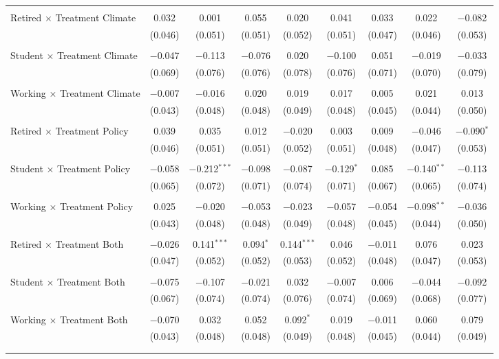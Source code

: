 \begin{tabular}{@{\extracolsep{5pt}}lcccccccc}
  & & & & & & & & \\ 
 Retired $\times$ Treatment Climate & 0.032 & 0.001 & 0.055 & 0.020 & 0.041 & 0.033 & 0.022 & $-$0.082 \\ 
  & (0.046) & (0.051) & (0.051) & (0.052) & (0.051) & (0.047) & (0.046) & (0.053) \\ 
  & & & & & & & & \\ 
 Student $\times$ Treatment Climate & $-$0.047 & $-$0.113 & $-$0.076 & 0.020 & $-$0.100 & 0.051 & $-$0.019 & $-$0.033 \\ 
  & (0.069) & (0.076) & (0.076) & (0.078) & (0.076) & (0.071) & (0.070) & (0.079) \\ 
  & & & & & & & & \\ 
 Working $\times$ Treatment Climate & $-$0.007 & $-$0.016 & 0.020 & 0.019 & 0.017 & 0.005 & 0.021 & 0.013 \\ 
  & (0.043) & (0.048) & (0.048) & (0.049) & (0.048) & (0.045) & (0.044) & (0.050) \\ 
  & & & & & & & & \\ 
 Retired $\times$ Treatment Policy & 0.039 & 0.035 & 0.012 & $-$0.020 & 0.003 & 0.009 & $-$0.046 & $-$0.090$^{*}$ \\ 
  & (0.046) & (0.051) & (0.051) & (0.052) & (0.051) & (0.048) & (0.047) & (0.053) \\ 
  & & & & & & & & \\ 
 Student $\times$ Treatment Policy & $-$0.058 & $-$0.212$^{***}$ & $-$0.098 & $-$0.087 & $-$0.129$^{*}$ & 0.085 & $-$0.140$^{**}$ & $-$0.113 \\ 
  & (0.065) & (0.072) & (0.071) & (0.074) & (0.071) & (0.067) & (0.065) & (0.074) \\ 
  & & & & & & & & \\ 
 Working $\times$ Treatment Policy & 0.025 & $-$0.020 & $-$0.053 & $-$0.023 & $-$0.057 & $-$0.054 & $-$0.098$^{**}$ & $-$0.036 \\ 
  & (0.043) & (0.048) & (0.048) & (0.049) & (0.048) & (0.045) & (0.044) & (0.050) \\ 
  & & & & & & & & \\ 
 Retired $\times$ Treatment Both & $-$0.026 & 0.141$^{***}$ & 0.094$^{*}$ & 0.144$^{***}$ & 0.046 & $-$0.011 & 0.076 & 0.023 \\ 
  & (0.047) & (0.052) & (0.052) & (0.053) & (0.052) & (0.048) & (0.047) & (0.053) \\ 
  & & & & & & & & \\ 
 Student $\times$ Treatment Both & $-$0.075 & $-$0.107 & $-$0.021 & 0.032 & $-$0.007 & 0.006 & $-$0.044 & $-$0.092 \\ 
  & (0.067) & (0.074) & (0.074) & (0.076) & (0.074) & (0.069) & (0.068) & (0.077) \\ 
  & & & & & & & & \\ 
 Working $\times$ Treatment Both & $-$0.070 & 0.032 & 0.052 & 0.092$^{*}$ & 0.019 & $-$0.011 & 0.060 & 0.079 \\ 
  & (0.043) & (0.048) & (0.048) & (0.049) & (0.048) & (0.045) & (0.044) & (0.049) \\ 
  & & & & & & & & \\ 
\hline \\[-1.8ex] 


\end{tabular}
